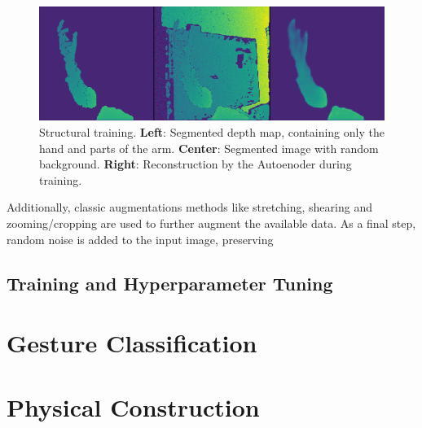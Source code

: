 \begin{figure}
	\centering
	\includegraphics[width=0.7\linewidth]{Ressourcen/ae_example}
	\caption[Structural training]{Structural training. \textbf{Left}: Segmented depth map, containing only the hand and parts of the arm. \textbf{Center}: Segmented image with random background. \textbf{Right}: Reconstruction by the Autoenoder during training. }
	\label{fig:aeexample}
\end{figure}


 Additionally, classic augmentations methods like stretching, shearing and zooming/cropping are used to further augment the available data. As a final step, random noise is added to the input image, preserving 

\subsection{Training and Hyperparameter Tuning}


\section{Gesture Classification}
\section{Physical Construction}
